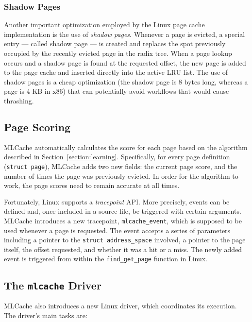 \subsubsection{Shadow Pages} \label{sss:shadow}

Another important optimization employed by the Linux page cache implementation
is the use of \emph{shadow pages}. Whenever a page is evicted, a special entry
--- called shadow page --- is created and replaces the spot previously occupied
by the recently evicted page in the radix tree. When a page lookup occurs and a
shadow page is found at the requested offset, the new page is added to the page
cache and inserted directly into the active LRU list. The use of shadow pages
is a cheap optimization (the shadow page is 8 bytes long, whereas a page is 4 KB
in x86) that can potentially avoid workflows that would cause thrashing.

\subsection{Page Scoring}

MLCache automatically calculates the score for each page based on the algorithm
described in Section~\ref{section:learning}. Specifically, for every page definition
(\texttt{struct page}), MLCache adds two new fields: the current page score, and
the number of times the page was previously evicted. In order for the algorithm
to work, the page scores need to remain accurate at all times.

Fortunately, Linux supports a \emph{tracepoint} API. More precisely, events can be
defined and, once included in a source file, be triggered with certain arguments.
MLCache introduces a new tracepoint, \texttt{mlcache\_event}, which is supposed
to be used whenever a page is requested. The event accepts a series of parameters
including a pointer to the \texttt{struct address\_space} involved, a pointer to the
page itself, the offset requested, and whether it was a hit or a miss. The newly
added event is triggered from within the \texttt{find\_get\_page} function in Linux.

\subsection{The \texttt{mlcache} Driver}

MLCache also introduces a new Linux driver, which coordinates its execution. The
driver's main tasks are:

